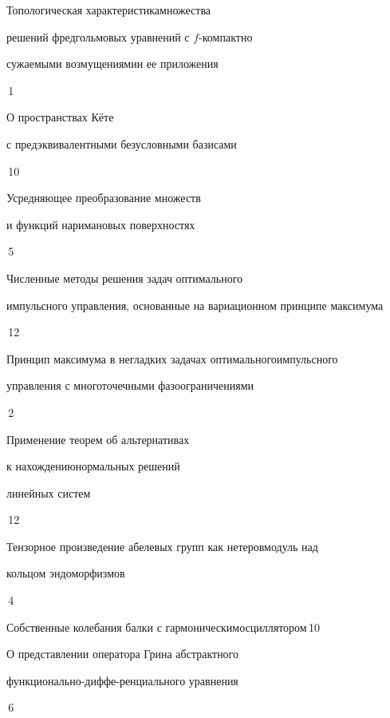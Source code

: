 

{Топологическая характеристика\newline множества


решений фредгольмовых уравнений с $f$-компактно 


сужаемыми возмущениями\newline и ее приложения}{\No\,1}




{О пространствах К\"ете 


с предэквивалентными безусловными базисами}{\No\,10}




{Усредняющее преобразование множеств


и функций на\newline римановых поверхностях}{\No\,5}




{Численные методы решения задач оптимального\newline


импульсного управления, основанные на вариационном принципе максимума}{\No\,12}




{Принцип максимума в негладких задачах оптимального\newline импульсного


управления с многоточечными фазоограничениями}{\No\,2}




{Применение теорем об альтернативах


к нахождению\newline нормальных решений


линейных систем}{\No\,12}




{Тензорное произведение абелевых групп как нетеров\newline модуль над 


кольцом эндоморфизмов}{\No\,4}




{Собственные колебания балки с гармоническим\newline осциллятором}{\No\,10}




{О представлении оператора Грина абстрактного 


функционально-диффе-\newline ренциального уравнения}{\No\,6}


